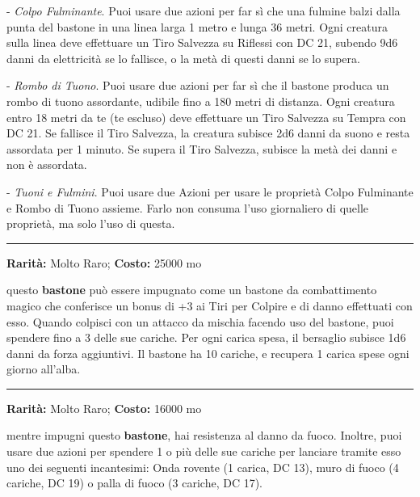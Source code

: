 \begin{multicols}{2}
- \emph{Colpo Fulminante}. Puoi usare due azioni per far sì che una fulmine balzi dalla punta del bastone in una linea larga 1 metro e lunga 36 metri. Ogni creatura sulla linea deve effettuare un Tiro Salvezza su Riflessi con DC 21, subendo 9d6 danni da elettricità se lo fallisce, o la metà di questi danni se lo supera.

- \emph{Rombo di Tuono}. Puoi usare due azioni per far sì che il bastone produca un rombo di tuono assordante, udibile fino a 180 metri di distanza. Ogni creatura entro 18 metri da te (te escluso) deve effettuare un Tiro Salvezza su Tempra con DC 21. Se fallisce il Tiro Salvezza, la creatura subisce 2d6 danni da suono e resta assordata per 1 minuto. Se supera il Tiro Salvezza, subisce la metà dei danni e non è assordata.

- \emph{Tuoni e Fulmini}. Puoi usare due Azioni per usare le proprietà Colpo Fulminante e Rombo di Tuono assieme. Farlo non consuma l'uso giornaliero di quelle proprietà, ma solo l'uso di questa.

\smallskip\noindent\rule{\linewidth}{2pt}  \hypertarget{BastonedelColpire}{}\medskip{}\noindent\label{BastonedelColpire}

\textbf{Rarità:} Molto Raro; \textbf{Costo:} 25000 mo

questo \textbf{bastone} può essere impugnato come un bastone da combattimento magico che conferisce un bonus di +3 ai Tiri per Colpire e di danno effettuati con esso. Quando colpisci con un attacco da mischia facendo uso del bastone, puoi spendere fino a 3 delle sue cariche. Per ogni carica spesa, il bersaglio subisce 1d6 danni da forza aggiuntivi. Il bastone ha 10 cariche, e recupera 1 carica spese ogni giorno all'alba.

\smallskip\noindent\rule{\linewidth}{2pt}  \hypertarget{BastonedelFuoco}{}\medskip{}\noindent\label{BastonedelFuoco}

\textbf{Rarità:} Molto Raro; \textbf{Costo:} 16000 mo

mentre impugni questo \textbf{bastone}, hai resistenza al danno da fuoco.
Inoltre, puoi usare due azioni per spendere 1 o più delle sue cariche per lanciare tramite esso uno dei seguenti incantesimi: Onda rovente (1 carica, DC 13), muro di fuoco (4 cariche, DC 19) o palla di fuoco (3 cariche, DC 17).


\end{multicols}

